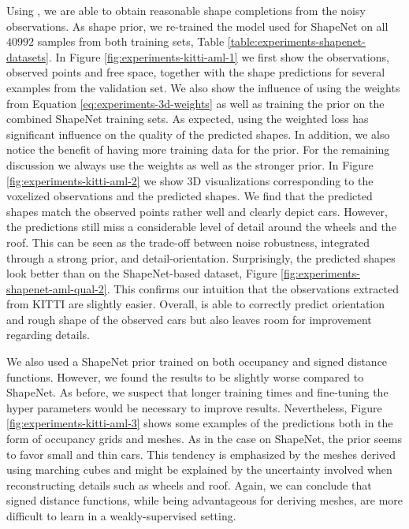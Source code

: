 Using \AML, we are able to obtain reasonable shape completions from the
noisy observations. As shape prior, we re-trained the model used for ShapeNet
on all $40992$ samples from both training sets, \cf Table
\ref{table:experiments-shapenet-datasets}. In Figure
\ref{fig:experiments-kitti-aml-1} we first show
the observations, \ie observed points and free space, together with
the shape predictions for several examples from the validation set.
We also show the influence of using the weights from Equation
\eqref{eq:experiments-3d-weights} as well as training the prior on the combined
ShapeNet training sets.
As expected, using the weighted
loss has significant influence on the quality of the predicted shapes. In addition,
we also notice the benefit of having more training data for the prior. For the remaining
discussion we always use the weights as well as the stronger prior.
In Figure \ref{fig:experiments-kitti-aml-2} we show 3D visualizations
corresponding to the voxelized observations and the predicted shapes.
We find that the predicted shapes match the observed points rather well
and clearly depict cars. However, the predictions still miss a considerable
level of detail around the wheels and the roof. This can be seen as the
trade-off between noise robustness,
integrated through a strong prior, and detail-orientation.
Surprisingly, the predicted shapes look better than on the \hard ShapeNet-based
dataset, \ie Figure \ref{fig:experiments-shapenet-aml-qual-2}. This confirms our
intuition that the observations extracted from KITTI are slightly easier.
Overall, \AML is able to correctly predict orientation and rough shape
of the observed cars but also leaves room for improvement regarding details.

We also used a ShapeNet prior trained on both occupancy and signed distance
functions. However, we found the results to be slightly worse compared to
ShapeNet. As before, we suspect that longer training times and fine-tuning the
hyper parameters would be necessary to improve results. Nevertheless,
Figure \ref{fig:experiments-kitti-aml-3}
shows some examples of the predictions both in the form of occupancy grids
and meshes. As in the \hard case on ShapeNet, the prior
seems to favor small and thin cars. This tendency is emphasized by
the meshes derived using marching cubes and might be explained
by the uncertainty involved when reconstructing details such as wheels and roof.
Again, we can conclude that signed
distance functions, while being advantageous for deriving meshes, are more
difficult to learn in a weakly-supervised setting.

